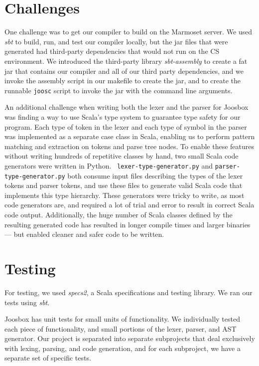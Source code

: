 \documentclass[letterpaper]{article}
\begin{document}
  \section{Challenges}

  One challenge was to get our compiler to build on the Marmoset server. We used
  {\em sbt} to build, run, and test our compiler locally, but the jar files that
  were generated had third-party dependencies that would not run on the CS
  environment. We introduced the third-party library {\em sbt-assembly} to
  create a fat jar that contains our compiler and all of our third party
  dependencies, and we invoke the assembly script in our makefile to create the
  jar, and to create the runnable {\tt joosc} script to invoke the jar with the
  command line arguments.

  An additional challenge when writing both the lexer and the parser for Joosbox
  was finding a way to use Scala's type system to guarantee type safety for our
  program. Each type of token in the lexer and each type of symbol in the parser
  was implemented as a separate case class in Scala, enabling us to perform
  pattern matching and extraction on tokens and parse tree nodes. To enable
  these features without writing hundreds of repetitive classes by hand, two
  small Scala code generators were written in Python.  {\tt
  lexer-type-generator.py} and {\tt parser-type-generator.py} both consume input
  files describing the types of the lexer tokens and parser tokens, and use
  these files to generate valid Scala code that implements this type hierarchy.
  These generators were tricky to write, as most code generators are, and
  required a lot of trial and error to result in correct Scala code output.
  Additionally, the huge number of Scala classes defined by the resulting
  generated code has resulted in longer compile times and larger binaries ---
  but enabled cleaner and safer code to be written.

  \section{Testing}

  For testing, we used {\em specs2}, a Scala specifications and testing library.
  We ran our tests using {\em sbt}.

  Joosbox has unit tests for small units of functionality. We individually
  tested each piece of functionality, and small portions of the lexer, parser,
  and AST generator. Our project is separated into separate subprojects that
  deal exclusively with lexing, parsing, and code generation, and for each
  subproject, we have a separate set of specific tests.
\end{document}
